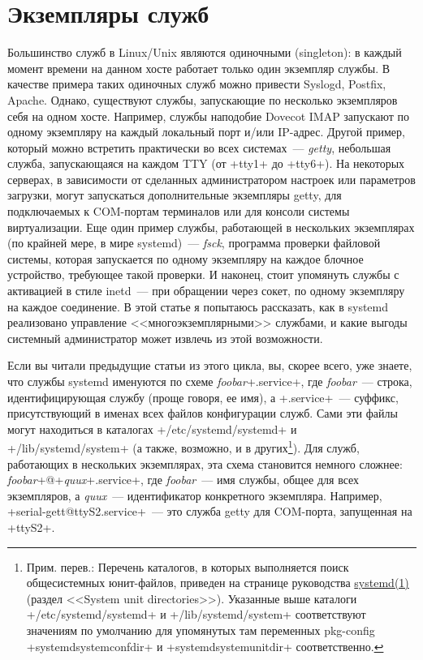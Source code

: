 \documentclass[10pt,oneside,a4paper]{article}
\begin{document}
\section{Экземпляры служб}
\label{sec:instances}

Большинство служб в Linux/Unix являются одиночными (singleton): в каждый момент
времени на данном хосте работает только один экземпляр службы. В качестве
примера таких одиночных служб можно привести Syslogd, Postfix, Apache. Однако,
существуют службы, запускающие по несколько экземпляров себя на одном хосте.
Например, службы наподобие Dovecot IMAP запускают по одному экземпляру на каждый
локальный порт и/или IP-адрес. Другой пример, который можно встретить
практически во всех системах~--- \emph{getty}, небольшая служба, запускающаяся на
каждом TTY (от +tty1+ до +tty6+). На некоторых серверах, в зависимости от
сделанных администратором настроек или параметров загрузки, могут запускаться
дополнительные экземпляры getty, для подключаемых к COM-портам терминалов или
для консоли системы виртуализации. Еще один пример службы, работающей в
нескольких экземплярах (по крайней мере, в мире systemd)~--- \emph{fsck},
программа проверки файловой системы, которая запускается по одному экземпляру
на каждое блочное устройство, требующее такой проверки. И наконец, стоит
упомянуть службы с активацией в стиле inetd~--- при обращении через сокет, по
одному экземпляру на каждое соединение. В этой статье я попытаюсь рассказать,
как в systemd реализовано управление <<многоэкземплярными>> службами, и какие
выгоды системный администратор может извлечь из этой возможности.

Если вы читали предыдущие статьи из этого цикла, вы, скорее всего, уже знаете,
что службы systemd именуются по схеме \emph{foobar}+.service+, где
\emph{foobar}~--- строка, идентифицирующая службу (проще говоря, ее имя), а
+.service+~--- суффикс, присутствующий в именах всех файлов конфигурации служб.
Сами эти файлы могут находиться в каталогах +/etc/systemd/systemd+ и
+/lib/systemd/system+ (а также, возможно, и в других\footnote{Прим. перев.:
Перечень каталогов, в которых выполняется поиск общесистемных юнит-файлов,
приведен на странице руководства 
\href{http://www.0pointer.de/public/systemd-man/systemd.html}{systemd(1)}
(раздел <<System unit directories>>).  Указанные выше каталоги
+/etc/systemd/systemd+ и +/lib/systemd/system+ соответствуют значениям по
умолчанию для упомянутых там переменных pkg-config +systemdsystemconfdir+ и
+systemdsystemunitdir+ соответственно.}). Для служб, работающих в нескольких
экземплярах, эта схема становится немного сложнее:
\emph{foobar}+@+\emph{quux}+.service+, где \emph{foobar}~--- имя службы, общее
для всех экземпляров, а \emph{quux}~--- идентификатор конкретного экземпляра.
Например, +serial-gett@ttyS2.service+~--- это служба getty для COM-порта,
запущенная на +ttyS2+.
\end{document}
